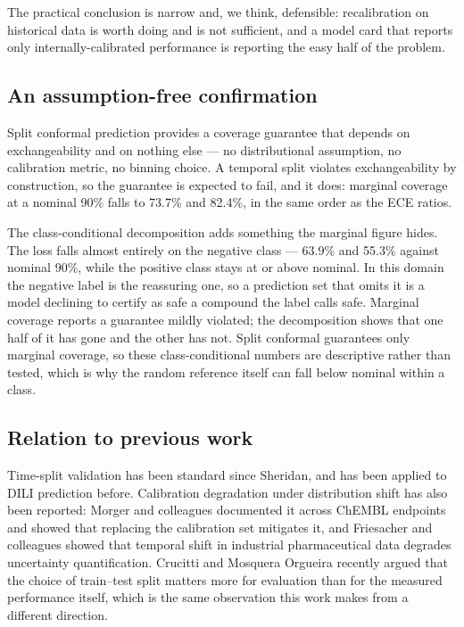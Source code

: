The practical conclusion is narrow and, we think, defensible: recalibration on
historical data is worth doing and is not sufficient, and a model card that
reports only internally-calibrated performance is reporting the easy half of the
problem.

\subsection{An assumption-free confirmation}

Split conformal prediction provides a coverage guarantee that depends on
exchangeability and on nothing else --- no distributional assumption, no
calibration metric, no binning choice. A temporal split violates exchangeability
by construction, so the guarantee is expected to fail, and it does: marginal
coverage at a nominal 90\% falls to 73.7\% and 82.4\%, in the same order as the
ECE ratios.

The class-conditional decomposition adds something the marginal figure hides. The
loss falls almost entirely on the negative class --- 63.9\% and 55.3\% against
nominal 90\%, while the positive class stays at or above nominal. In this domain
the negative label is the reassuring one, so a prediction set that omits it is a
model declining to certify as safe a compound the label calls safe. Marginal
coverage reports a guarantee mildly violated; the decomposition shows that one
half of it has gone and the other has not. Split conformal guarantees only
marginal coverage, so these class-conditional numbers are descriptive rather than
tested, which is why the random reference itself can fall below nominal within a
class.

\subsection{Relation to previous work}

Time-split validation has been standard since Sheridan, and has been applied to
DILI prediction before. Calibration degradation under distribution shift has also
been reported: Morger and colleagues documented it across ChEMBL endpoints and
showed that replacing the calibration set mitigates it, and Friesacher and
colleagues showed that temporal shift in industrial pharmaceutical data degrades
uncertainty quantification. Crucitti and Mosquera Orgueira recently argued that the
choice of train--test split matters more for evaluation than for the measured
performance itself, which is the same observation this work makes from a different
direction.

